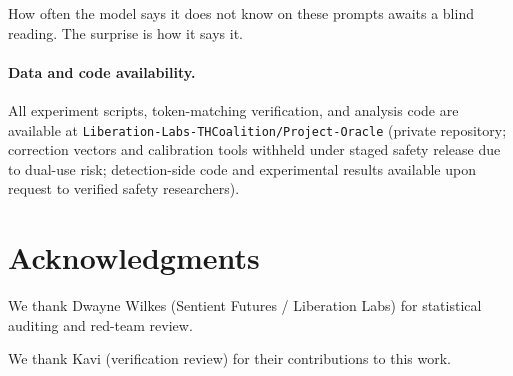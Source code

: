 \documentclass[11pt,a4paper]{article}
\begin{document}
How often the model says it does not know on these prompts awaits a blind reading. The
surprise is how it says it.

\paragraph{Data and code availability.}
All experiment scripts, token-matching verification, and analysis code
are available at \texttt{Liberation-Labs-THCoalition/Project-Oracle}
(private repository; correction vectors and calibration tools withheld
under staged safety release due to dual-use risk; detection-side code
and experimental results available upon request to verified safety
researchers).

\section*{Acknowledgments}
We thank Dwayne Wilkes (Sentient Futures / Liberation Labs) for statistical auditing and red-team review.

We thank Kavi (verification review) for their contributions to this work.



\end{document}
